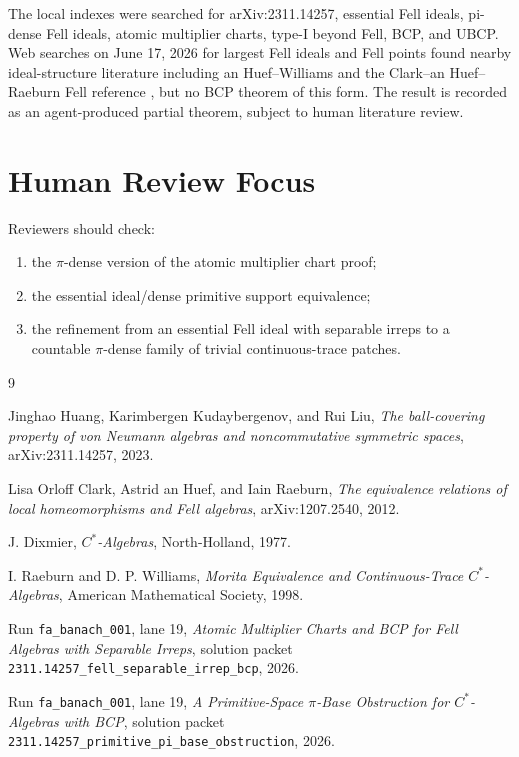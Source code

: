 \documentclass[11pt]{article}
\begin{document}
The local indexes were searched for arXiv:2311.14257, essential Fell ideals,
pi-dense Fell ideals, atomic multiplier charts, type-I beyond Fell, BCP, and
UBCP.  Web searches on June 17, 2026 for largest Fell ideals and Fell points
found nearby ideal-structure literature including an Huef--Williams and the
Clark--an Huef--Raeburn Fell reference \cite{CHR}, but no BCP theorem of this
form.  The result is recorded as an agent-produced partial theorem, subject
to human literature review.

\section*{Human Review Focus}

Reviewers should check:
\begin{enumerate}
    \item the \(\pi\)-dense version of the atomic multiplier chart proof;
    \item the essential ideal/dense primitive support equivalence;
    \item the refinement from an essential Fell ideal with separable irreps to
          a countable \(\pi\)-dense family of trivial continuous-trace patches.
\end{enumerate}

\begin{thebibliography}{9}

Jinghao Huang, Karimbergen Kudaybergenov, and Rui Liu,
\emph{The ball-covering property of von Neumann algebras and noncommutative
symmetric spaces},
arXiv:2311.14257, 2023.

Lisa Orloff Clark, Astrid an Huef, and Iain Raeburn,
\emph{The equivalence relations of local homeomorphisms and Fell algebras},
arXiv:1207.2540, 2012.

J. Dixmier,
\emph{\(C^*\)-Algebras},
North-Holland, 1977.

I. Raeburn and D. P. Williams,
\emph{Morita Equivalence and Continuous-Trace \(C^*\)-Algebras},
American Mathematical Society, 1998.

Run \texttt{fa\_banach\_001}, lane 19,
\emph{Atomic Multiplier Charts and BCP for Fell Algebras with Separable
Irreps},
solution packet
\texttt{2311.14257\_fell\_separable\_irrep\_bcp}, 2026.

Run \texttt{fa\_banach\_001}, lane 19,
\emph{A Primitive-Space \(\pi\)-Base Obstruction for \(C^*\)-Algebras with
BCP},
solution packet
\texttt{2311.14257\_primitive\_pi\_base\_obstruction}, 2026.

\end{thebibliography}
\end{document}
